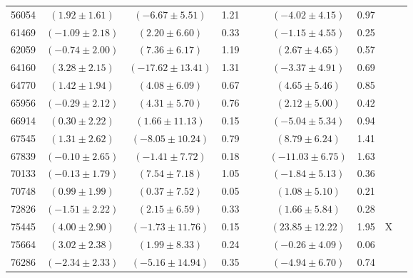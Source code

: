 \documentclass [10pt, twoside] {uwthesis}[2012/04/02]
\begin{document}
{\begin{longtable}[t]{|c|c|cccc|cccc|}
56054	&  $(	1.92	  \pm  	1.61	)$  &  $(	-6.67	  \pm  	5.51	)$  &  	1.21	  &  		  &  		  &  $(	-4.02	  \pm  	4.15	)$  &  	0.97	  &  		  &  		  \\
61469	&  $(	-1.09	  \pm  	2.18	)$  &  $(	2.20	  \pm  	6.60	)$  &  	0.33	  &  		  &  		  &  $(	-1.15	  \pm  	4.55	)$  &  	0.25	  &  		  &  		  \\
62059	&  $(	-0.74	  \pm  	2.00	)$  &  $(	7.36	  \pm  	6.17	)$  &  	1.19	  &  		  &  		  &  $(	2.67	  \pm  	4.65	)$  &  	0.57	  &  		  &  		  \\
64160	&  $(	3.28	  \pm  	2.15	)$  &  $(	-17.62	  \pm  	13.41	)$  &  	1.31	  &  		  &  		  &  $(	-3.37	  \pm  	4.91	)$  &  	0.69	  &  		  &  		  \\
64770	&  $(	1.42	  \pm  	1.94	)$  &  $(	4.08	  \pm  	6.09	)$  &  	0.67	  &  		  &  		  &  $(	4.65	  \pm  	5.46	)$  &  	0.85	  &  		  &  		  \\
65956	&  $(	-0.29	  \pm  	2.12	)$  &  $(	4.31	  \pm  	5.70	)$  &  	0.76	  &  		  &  		  &  $(	2.12	  \pm  	5.00	)$  &  	0.42	  &  		  &  		  \\
66914	&  $(	0.30	  \pm  	2.22	)$  &  $(	1.66	  \pm  	11.13	)$  &  	0.15	  &  		  &  		  &  $(	-5.04	  \pm  	5.34	)$  &  	0.94	  &  		  &  		  \\
67545	&  $(	1.31	  \pm  	2.62	)$  &  $(	-8.05	  \pm  	10.24	)$  &  	0.79	  &  		  &  		  &  $(	8.79	  \pm  	6.24	)$  &  	1.41	  &  		  &  		  \\
67839	&  $(	-0.10	  \pm  	2.65	)$  &  $(	-1.41	  \pm  	7.72	)$  &  	0.18	  &  		  &  		  &  $(	-11.03	  \pm  	6.75	)$  &  	1.63	  &  		  &  		  \\
70133	&  $(	-0.13	  \pm  	1.79	)$  &  $(	7.54	  \pm  	7.18	)$  &  	1.05	  &  		  &  		  &  $(	-1.84	  \pm  	5.13	)$  &  	0.36	  &  		  &  		  \\
70748	&  $(	0.99	  \pm  	1.99	)$  &  $(	0.37	  \pm  	7.52	)$  &  	0.05	  &  		  &  		  &  $(	1.08	  \pm  	5.10	)$  &  	0.21	  &  		  &  		  \\
72826	&  $(	-1.51	  \pm  	2.22	)$  &  $(	2.15	  \pm  	6.59	)$  &  	0.33	  &  		  &  		  &  $(	1.66	  \pm  	5.84	)$  &  	0.28	  &  		  &  		  \\
75445	&  $(	4.00	  \pm  	2.90	)$  &  $(	-1.73	  \pm  	11.76	)$  &  	0.15	  &  		  &  		  &  $(	23.85	  \pm  	12.22	)$  &  	1.95	  &  	X	  &  		  \\
75664	&  $(	3.02	  \pm  	2.38	)$  &  $(	1.99	  \pm  	8.33	)$  &  	0.24	  &  		  &  		  &  $(	-0.26	  \pm  	4.09	)$  &  	0.06	  &  		  &  		  \\
76286	&  $(	-2.34	  \pm  	2.33	)$  &  $(	-5.16	  \pm  	14.94	)$  &  	0.35	  &  		  &  		  &  $(	-4.94	  \pm  	6.70	)$  &  	0.74	  &  		  &  		  \\

\end{longtable}}
\end{document}
